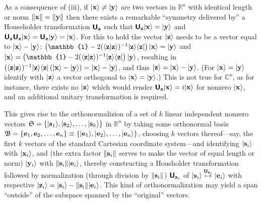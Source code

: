 As a consequence of (iii), if $\vert {\bf x} \rangle \neq \vert {\bf y} \rangle$ are two vectors  in $\mathbb{R}^n$
with identical length or norm
$\| {\bf x} \| = \| {\bf y} \|$
then there exists a remarkable ``symmetry delivered by'' a Householder transformation $\textsf{\textbf{U}}_{\bf z}$ such that
$\textsf{\textbf{U}}_{\bf z} \vert {\bf x} \rangle =  \vert {\bf y} \rangle$
and
$\textsf{\textbf{U}}_{\bf z}\textsf{\textbf{U}}_{\bf z} \vert {\bf x} \rangle =  \textsf{\textbf{U}}_{\bf z}\vert {\bf y} \rangle
=  \vert {\bf x} \rangle$.
For this to hold the vector $\vert {\bf z} \rangle$ needs to be a  vector equal to $\vert {\bf x} \rangle - \vert {\bf y} \rangle$:
$  \left( \mathbb{1}- 2  ( \langle {\bf z} \vert   {\bf z} \rangle )^{-1} \vert {\bf z} \rangle \langle  {\bf z}  \vert  \right) \vert {\bf x} \rangle =  \vert {\bf y} \rangle
$
and
$ \vert {\bf x} \rangle  =   \left( \mathbb{1}- 2  ( \langle {\bf z} \vert   {\bf z} \rangle )^{-1}\vert {\bf z} \rangle \langle  {\bf z}  \vert  \right) \vert {\bf y} \rangle
$,
resulting in
$( \langle {\bf z} \vert   {\bf z} \rangle )^{-1} \vert {\bf z} \rangle \langle  {\bf z}  \vert  \left( \vert {\bf x} \rangle  - \vert {\bf y} \rangle \right)
= \vert {\bf x} \rangle  - \vert {\bf y} \rangle
$, and thus $\vert {\bf z} \rangle =  \vert {\bf x} \rangle  - \vert {\bf y} \rangle$.
(For $\vert {\bf x} \rangle = \vert {\bf y} \rangle$ identify with $\vert {\bf z} \rangle$ a vector orthogonal to $\vert {\bf x} \rangle = \vert {\bf y} \rangle$.)
This is not true for $\mathbb{C}^n$, as for instance, there exists no $ \vert {\bf z} \rangle $ which would render
$\textsf{\textbf{U}}_{\bf z} \vert {\bf x} \rangle =  i \vert {\bf x} \rangle$ for nonzero  $ \vert {\bf x} \rangle $,
and an additional unitary transformation is required.

This gives rise to the orthonormalizion of a set of $k$ linear independent nonzero vectors
${\frak S}=\{\vert {\bf s}_1\rangle ,
\vert  {\bf s}_2\rangle , \ldots , \vert {\bf s}_k\rangle \}$   in $\mathbb{R}^n$
by taking some orthonormal basis
${\frak B}=\{{\bf e}_1,  {\bf e}_2, \ldots , {\bf e}_n\}\equiv \{\vert {\bf e}_1\rangle ,
\vert  {\bf e}_2\rangle , \ldots , \vert {\bf e}_n\rangle \}$,
choosing $k$ vectors thereof---say, the first $k$ vectors of the standard Cartesian coordinate system---and identifying
$\vert {\bf s}_i\rangle$ with $\vert {\bf x}_i\rangle$,
and (the extra factor $\| {\bf s}_i \|$ serves to make the vector of equal length or norm)
$\vert {\bf y}_i\rangle$ with $\| {\bf s}_i \| \vert {\bf e}_i\rangle$,
thereby constructing a Housholder transformation followed by normalization (through division by $\| {\bf s}_i \|$)
$\textsf{\textbf{U}}_{{\bf z}_i}$ of $\vert {\bf s}_i\rangle \stackrel{\textsf{\textbf{U}}_{{\bf z}_i}}{\mapsto} \vert {\bf e}_i\rangle$
with respective
$\vert {\bf z}_i\rangle = \vert {\bf s}_i\rangle  - \| {\bf s}_i \| \vert {\bf e}_i\rangle$.
This kind of orthonormalization may yield a span ``outside'' of the  subspace  spanned by the ``original'' vectors.

